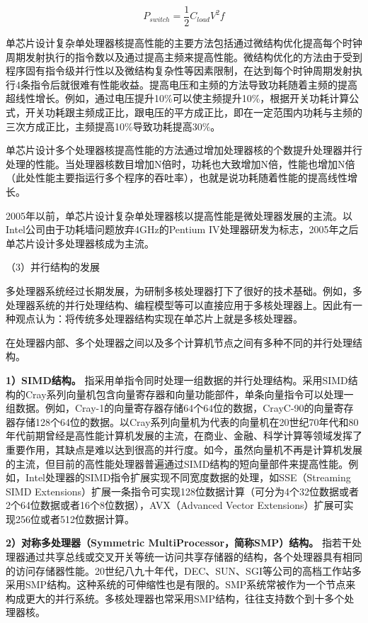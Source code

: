 \documentclass[]{ctexbook}
\begin{document}
\[ P_{switch} = \frac{1}{2} C_{load} V^{2} f \]

单芯片设计复杂单处理器核提高性能的主要方法包括通过微结构优化提高每个时钟周期发射执行的指令数以及通过提高主频来提高性能。微结构优化的方法由于受到程序固有指令级并行性以及微结构复杂性等因素限制，在达到每个时钟周期发射执行4条指令后就很难有性能收益。提高电压和主频的方法导致功耗随着主频的提高超线性增长。例如，通过电压提升10\%可以使主频提升10\%，根据开关功耗计算公式，开关功耗跟主频成正比，跟电压的平方成正比，即在一定范围内功耗与主频的三次方成正比，主频提高10\%导致功耗提高30\%。

单芯片设计多个处理器核提高性能的方法通过增加处理器核的个数提升处理器并行处理的性能。当处理器核数目增加N倍时，功耗也大致增加N倍，性能也增加N倍（此处性能主要指运行多个程序的吞吐率），也就是说功耗随着性能的提高线性增长。

2005年以前，单芯片设计复杂单处理器核以提高性能是微处理器发展的主流。以Intel公司由于功耗墙问题放弃4GHz的Pentium IV处理器研发为标志，2005年之后单芯片设计多处理器核成为主流。

（3）并行结构的发展

多处理器系统经过长期发展，为研制多核处理器打下了很好的技术基础。例如，多处理器系统的并行处理结构、编程模型等可以直接应用于多核处理器上。因此有一种观点认为：将传统多处理器结构实现在单芯片上就是多核处理器。

在处理器内部、多个处理器之间以及多个计算机节点之间有多种不同的并行处理结构。

\textbf{1）SIMD结构。} 指采用单指令同时处理一组数据的并行处理结构。采用SIMD结构的Cray系列向量机包含向量寄存器和向量功能部件，单条向量指令可以处理一组数据。例如，Cray-1的向量寄存器存储64个64位的数据，CrayC-90的向量寄存器存储128个64位的数据。以Cray系列向量机为代表的向量机在20世纪70年代和80年代前期曾经是高性能计算机发展的主流，在商业、金融、科学计算等领域发挥了重要作用，其缺点是难以达到很高的并行度。如今，虽然向量机不再是计算机发展的主流，但目前的高性能处理器普遍通过SIMD结构的短向量部件来提高性能。例如，Intel处理器的SIMD指令扩展实现不同宽度数据的处理，如SSE（Streaming SIMD Extensions）扩展一条指令可实现128位数据计算（可分为4个32位数据或者2个64位数据或者16个8位数据），AVX（Advanced Vector Extensions）扩展可实现256位或者512位数据计算。

\textbf{2）对称多处理器（Symmetric MultiProcessor，简称SMP）结构。} 指若干处理器通过共享总线或交叉开关等统一访问共享存储器的结构，各个处理器具有相同的访问存储器性能。20世纪八九十年代，DEC、SUN、SGI等公司的高档工作站多采用SMP结构。这种系统的可伸缩性也是有限的。SMP系统常被作为一个节点来构成更大的并行系统。多核处理器也常采用SMP结构，往往支持数个到十多个处理器核。
\end{document}
